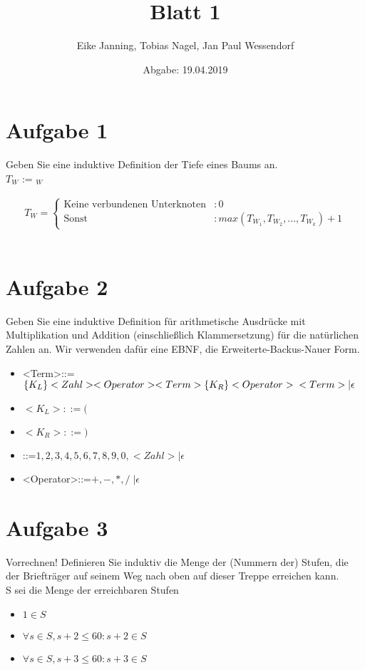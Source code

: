 \documentclass[paper = a4, ngerman]{scrartcl}
\title{Blatt 1}
\author{Eike Janning, Tobias Nagel, Jan Paul Wessendorf}
\date{Abgabe: 19.04.2019}
\begin{document}
\maketitle
\hrulefill

\section*{Aufgabe 1}

Geben Sie eine induktive Definition der Tiefe eines Baums an.\\
$T_W$ :=  $_W$

	\begin{align*}
		T_W =
		\begin{cases}
			\text{Keine verbundenen Unterknoten} &: 0\\
			\text{Sonst} &: max(T_{W_1}, T_{W_2}, ..., T_{W_k}) + 1
		\end{cases}
	\end{align*}\\

\section*{Aufgabe 2}
	 Geben Sie eine induktive Definition für arithmetische Ausdrücke mit Multiplikation und Addition (einschließlich Klammersetzung) für die natürlichen Zahlen an. Wir verwenden dafür eine EBNF, die Erweiterte-Backus-Nauer Form.
		\begin{itemize}
			\item <Term>::=$\left\{K_L\right\}<Zahl><Operator><Term>\left\{K_R\right\}<Operator>\\<Term>|\epsilon$
			\item $<K_L>::=($
			\item $<K_R>::=)$
			\item <Zahl1>::=$1,2,3,4,5,6,7,8,9,0, <Zahl>|\epsilon$
			\item <Operator>::=$+,-,*,/ \; |\epsilon$
		\end{itemize}
	 	
\pagebreak%

\section*{Aufgabe 3}
Vorrechnen! Definieren Sie induktiv die Menge der (Nummern der) Stufen, die der Briefträger auf seinem Weg nach oben auf dieser Treppe erreichen kann.\\
S sei die Menge der erreichbaren Stufen
\begin{itemize}
	\item $1 \in S$
	\item $\forall s \in S, s+2 \le 60 : s + 2 \in S$
	\item $\forall s \in S, s+3 \le 60 : s + 3 \in S$
\end{itemize}
\end{document}
